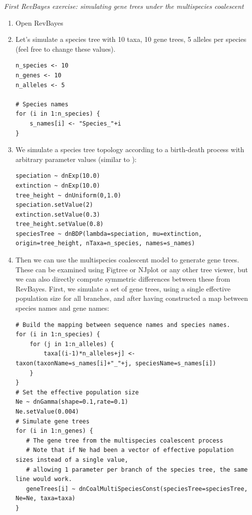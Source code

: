 \documentclass[11pt]{article}
\begin{document}
{\begin{framed}

\begin{center}
\emph{First RevBayes exercise: simulating gene trees under the multispecies coalescent}
\end{center}
\begin{enumerate}
\item Open RevBayes
\item Let's simulate a species tree with 10 taxa, 10 gene trees, 5 alleles per species (feel free to change these values).
{\tt \begin{snugshade*}
\begin{lstlisting}
n_species <- 10
n_genes <- 10
n_alleles <- 5

# Species names
for (i in 1:n_species) {
	s_names[i] <- "Species_"+i
}
\end{lstlisting}
\end{snugshade*}}
\item We simulate a species tree topology according to a birth-death process with arbitrary parameter values (similar to \citet{Leache2011}):
{\tt \begin{snugshade*}
\begin{lstlisting}
speciation ~ dnExp(10.0)
extinction ~ dnExp(10.0)
tree_height ~ dnUniform(0,1.0)
speciation.setValue(2)
extinction.setValue(0.3)
tree_height.setValue(0.8)
speciesTree ~ dnBDP(lambda=speciation, mu=extinction, origin=tree_height, nTaxa=n_species, names=s_names)
\end{lstlisting}
\end{snugshade*}}
\item Then we can use the multispecies coalescent model to generate gene trees. These can be examined using Figtree or NJplot or any other tree viewer, but we can also directly compute symmetric differences between these from RevBayes. First, we simulate a set of gene trees, using a single effective population size for all branches, and after having constructed a map between species names and gene names:
{\tt \begin{snugshade*}
\begin{lstlisting}
# Build the mapping between sequence names and species names.
for (i in 1:n_species) {
	for (j in 1:n_alleles) {
		taxa[(i-1)*n_alleles+j] <- taxon(taxonName=s_names[i]+"_"+j, speciesName=s_names[i])
	}
}
# Set the effective population size
Ne ~ dnGamma(shape=0.1,rate=0.1)
Ne.setValue(0.004)
# Simulate gene trees
for (i in 1:n_genes) {
   # The gene tree from the multispecies coalescent process
   # Note that if Ne had been a vector of effective population sizes instead of a single value, 
   # allowing 1 parameter per branch of the species tree, the same line would work.
   geneTrees[i] ~ dnCoalMultiSpeciesConst(speciesTree=speciesTree, Ne=Ne, taxa=taxa)
}
\end{lstlisting}
\end{snugshade*}}


\end{enumerate}
\end{framed}}
\end{document}
